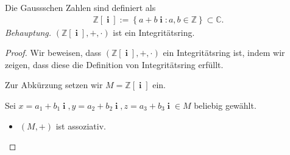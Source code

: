 \documentclass[12pt]{extarticle}
\newcommand{\im}{\operatorname{\textbf{i}}}
\begin{document}
  Die Gaussschen Zahlen sind definiert als
\begin{align*}
\mathbb{Z}[\im] := \left\{ a+b\im: a, b \in \mathbb{Z} \right\} \subset \mathbb{C}.
\end{align*}
\textit{Behauptung.}  \((\mathbb{Z}[\im], +, \cdot)\) ist ein Integritätsring.
  \begin{proof}
    Wir beweisen, dass \((\mathbb{Z}[\im], +, \cdot)\) ein Integritätsring
    ist, indem wir zeigen, dass diese die Definition von
    Integritätsring erfüllt.

    Zur Abkürzung setzen wir \(M=\mathbb{Z}[\im]\) ein.


    Sei \(x = a_1+b_1\im, y=a_2+b_2\im, z=a_3+b_3\im \in M\) beliebig
    gewählt.

    \begin{itemize}
    \item \((M, +)\) ist assoziativ.


\end{itemize}
\end{proof}
\end{document}
